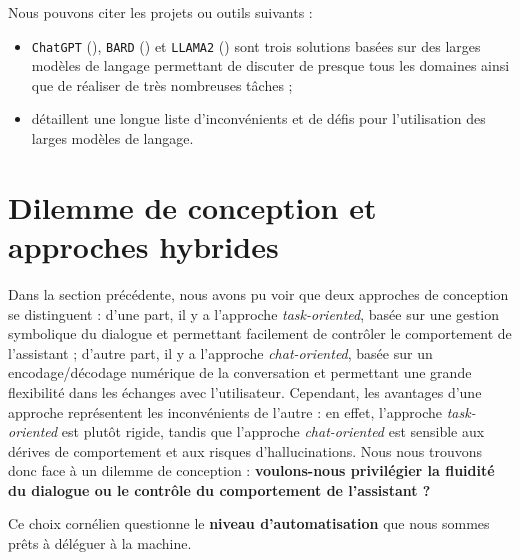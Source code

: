 			\begin{leftBarExamples}
				Nous pouvons citer les projets ou outils suivants :
				\begin{itemize}
					\item \texttt{ChatGPT} (\cite{openai:2023:chatgpt}), \texttt{BARD} (\cite{google:2023:bard-chat-based}) et \texttt{LLAMA2} (\cite{touvron-etal:2023:llama-open-foundation}) sont trois solutions basées sur des larges modèles de langage permettant de discuter de presque tous les domaines ainsi que de réaliser de très nombreuses tâches ;
					\item \cite{kaddour-etal:2023:challenges-applications-large} détaillent une longue liste d'inconvénients et de défis pour l'utilisation des larges modèles de langage.
				\end{itemize}
			\end{leftBarExamples}
	
	
	\newpage
	\section{Dilemme de conception et approches hybrides}
	\label{annex:B.3-ANNEXE-CHATBOTS-DILEMME}
		
		Dans la section précédente, nous avons pu voir que deux approches de conception se distinguent :
		d'une part, il y a l'approche \textit{task-oriented}, basée sur une gestion symbolique du dialogue et permettant facilement de contrôler le comportement de l'assistant ;
		d'autre part, il y a l'approche \textit{chat-oriented}, basée sur un encodage/décodage numérique de la conversation et permettant une grande flexibilité dans les échanges avec l'utilisateur.
		Cependant, les avantages d'une approche représentent les inconvénients de l'autre :
		en effet, l'approche \textit{task-oriented} est plutôt rigide, tandis que l'approche \textit{chat-oriented} est sensible aux dérives de comportement et aux risques d'hallucinations.
		Nous nous trouvons donc face à un dilemme de conception : \textbf{voulons-nous privilégier la fluidité du dialogue ou le contrôle du comportement de l'assistant ?}
		
		
		Ce choix cornélien questionne le \textbf{niveau d'automatisation} que nous sommes prêts à déléguer à la machine.
		
